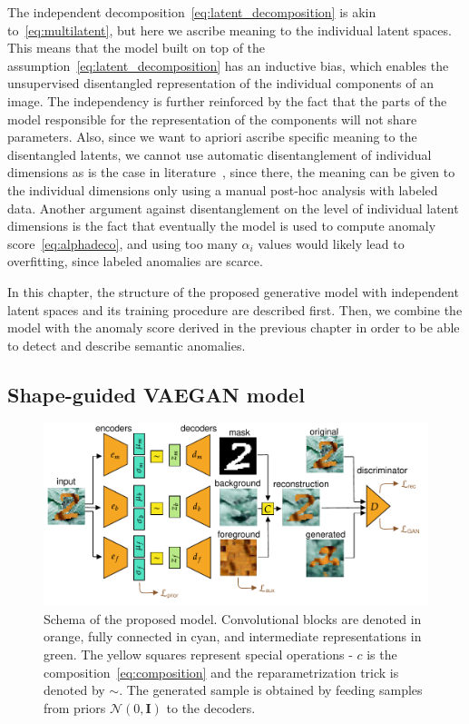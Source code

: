 The independent decomposition~\eqref{eq:latent_decomposition} is akin to~\eqref{eq:multilatent}, but here we ascribe meaning to the individual latent spaces. This means that the model built on top of the assumption~\eqref{eq:latent_decomposition} has an inductive bias, which enables the unsupervised disentangled representation of the individual components of an image. The independency is further reinforced by the fact that the parts of the model responsible for the representation of the components will not share parameters. Also, since we want to apriori ascribe specific meaning to the disentangled latents, we cannot use automatic disentanglement of individual dimensions as is the case in literature~\cite{burgess2018understanding, kim2019bayes, deecke2021transfer}, since there, the meaning can be given to the individual dimensions only using a manual post-hoc analysis with labeled data. Another argument against disentanglement on the level of individual latent dimensions is the fact that eventually the model is used to compute anomaly score~\eqref{eq:alphadeco}, and using too many $\alpha_i$ values would likely lead to overfitting, since labeled anomalies are scarce.

In this chapter, the structure of the proposed generative model with independent latent spaces and its training procedure are described first. Then, we combine the model with the anomaly score derived in the previous chapter in order to be able to detect and describe semantic anomalies.

\subsection{Shape-guided VAEGAN model} \label{sec:sgvaegan}
\begin{figure}[ht]
    \centering
       \includegraphics[width=\textwidth]{data/chapter_sgvaegan/sgvaegan_losses.pdf}
    \caption{Schema of the proposed model. Convolutional blocks are denoted in orange, fully connected in cyan, and intermediate representations in green. The yellow squares represent special operations - $c$ is the composition~\eqref{eq:composition} and the reparametrization trick is denoted by $\sim$. The generated sample is obtained by feeding samples from priors $\mathcal{N}(0,\mathbf{I})$ to the decoders.}
    \label{fig:sgvaegan_schema}
\end{figure}

